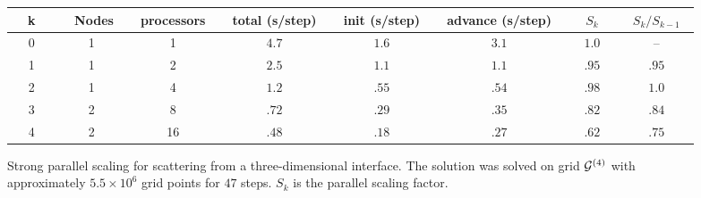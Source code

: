 \begin{figure}[hbt]
\begin{center}\small
%
\begin{tabular}{|c|c|c|c|c|c|c|c|} \hline
~~k~~&~ Nodes~  &~processors~&~total (s/step)~ &~init (s/step)~  &~advance (s/step)~ &  ~~$S_k$~~&  ~$S_k/S_{k-1}$~ \\ \hline
 0 &    1     &    1       & $4.7$    & $1.6$    & $3.1$    & ~$1.0 $~ & ~--~             \\ 
 1 &    1     &    2       & $2.5$    & $1.1$    & $1.1$    &  $.95 $  & ~$.95 $~            \\ 
 2 &    1     &    4       & $1.2$    & $.55$    & $.54$    &  $.98 $  & ~$1.0 $~            \\ 
 3 &    2     &    8       & $.72$    & $.29$    & $.35$    &  $.82 $  & ~$.84 $~            \\
 4 &    2     &   16       & $.48$    & $.18$    & $.27$    &  $.62 $  & ~$.75 $~            \\
\hline
\end{tabular}
\caption{Strong parallel scaling for scattering from a three-dimensional interface.
The solution was solved
on grid ${\mathcal G}^{(4)}$ with approximately $5.5\times10^{6}$ grid points for $47$ steps. $S_k$ is the 
parallel scaling factor. }
\label{fig:bump3dParallelScaling}
\end{center}
\end{figure}

